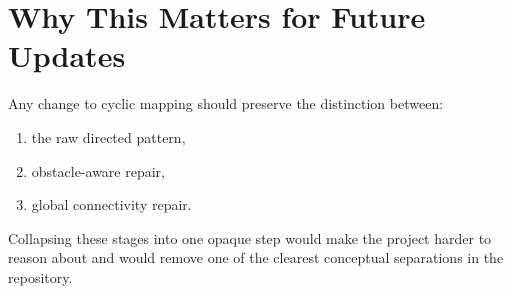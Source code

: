\documentclass[11pt]{article}
\begin{document}
\section{Why This Matters for Future Updates}

Any change to cyclic mapping should preserve the distinction between:
\begin{enumerate}[leftmargin=2em]
    \item the raw directed pattern,
    \item obstacle-aware repair,
    \item global connectivity repair.
\end{enumerate}

Collapsing these stages into one opaque step would make the project harder to reason about and would remove one of the clearest conceptual separations in the repository.
\end{document}
